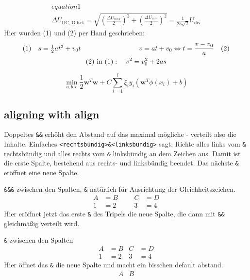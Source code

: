 \begin{gather}
  equation1 \\
  \Delta U_\text{DC, Offset}=\sqrt{\left(\frac{\Delta U_\text{max}}{2}\right)^2+\left(\frac{\Delta U_\text{min}}{2}\right)^2}=\frac{1}{25\sqrt{2}} U_\text{div}
\end{gather}
Hier wurden (1) und (2) per Hand geschrieben:
\begin{gather}
\begin{array}{c@{\hspace{3cm}}c}
(1)\quad s=\frac{1}{2}at^2+v_0t &v=at+v_0\Leftrightarrow t=\dfrac{v-v_0}{a}\quad (2)\nonumber\\
\end{array}\\
(2)\text{ in }(1):\quad v^2=v_0^2+2as
\label{eq:v^2}
\end{gather}

\begin{subequations}
\begin{equation}
  \operatorname{min}_{a,b,c} 
  \frac{1}{2}\mathbf{w}^{T}\mathbf{w} + C \sum_{i=1}^{l}\xi_{i} 
\end{equation}    
\begin{equation}
  y_{i}\left(\mathbf{w}^{T}\phi(x_{i})+b\right)
\end{equation}
\end{subequations}


\subsection{aligning with align}
Doppeltes \verb|&&| erhöht den Abstand auf das maximal mögliche - verteilt also die Inhalte. Einfaches \verb|<rechtsbündig>&<linksbündig>| sagt: Richte alles links vom \verb|&| rechtsbündig und alles rechts vom \verb|&| linksbündig an dem Zeichen aus. Damit ist die erste Spalte, bestehend aus rechts- und linksbündig beendet. Das nächste \verb|&| eröffnet eine neue Spalte.

\verb|&&&| zwischen den Spalten, \verb|&| natürlich für Ausrichtung der Gleichheitszeichen.
\begin{align}
  A&=B&&& C&=D\\
  1&=2&&& 3&=4
\end{align}
Hier eröffnet jetzt das erste \verb|&| des Tripels die neue Spalte, die dann mit \verb|&&| gleichmäßig verteilt wird.

\verb|&| zwischen den Spalten
\begin{align}
  A&=B&C&=D\\
  1&=2&3&=4
\end{align}
Hier öffnet das \verb|&| die neue Spalte und macht ein bisschen default abstand. 
\begin{align}
  A&B
\end{align}

